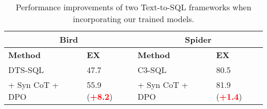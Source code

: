 \begin{table}[h!]
    \centering
\begin{adjustbox}{max width=0.9\columnwidth}
    \begin{tabular}{l l l l}
    \toprule
        \multicolumn{2}{c}{\textbf{Bird}} & \multicolumn{2}{c}{\textbf{Spider}} \\
    \midrule
        \textbf{Method} & \textbf{EX} & \textbf{Method} & \textbf{EX} \\
    \midrule
        DTS-SQL & 47.7 & C3-SQL & 80.5\\
        \quad + Syn CoT + DPO & 55.9 (\textbf{\textcolor{red}{+8.2}}) & \quad + Syn CoT + DPO & 81.9 (\textbf{\textcolor{red}{+1.4}}) \\
    \bottomrule
    \end{tabular}
\end{adjustbox}
\caption{Performance improvements of two Text-to-SQL frameworks when incorporating our trained models.}
\label{tab:OtherPipeline}
\end{table}